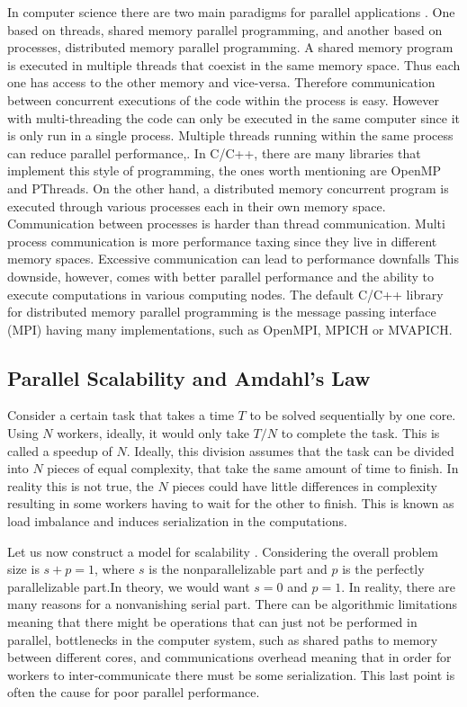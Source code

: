 	In computer science there are two main paradigms for parallel applications \cite{Hager2011}. One based on threads, shared memory parallel programming, and another based on processes, distributed memory parallel programming. 
	A shared memory program is executed in multiple threads that coexist in the same memory space. Thus each one has access to the other memory and vice-versa. Therefore communication between concurrent executions of the code within the process is easy. However with multi-threading the code can only be executed in the same computer since it is only run in a single process. Multiple threads running within the same process can reduce parallel performance,. In C/C++, there are many libraries that implement this style of programming, the ones worth mentioning are OpenMP and PThreads. 
	On the other hand, a distributed memory concurrent program is executed through various processes each in their own memory space. Communication between processes is harder than thread communication. Multi process communication is more performance taxing since they live in different memory spaces. Excessive communication can lead to performance downfalls This downside, however, comes with better parallel performance and the ability to execute computations in various computing nodes. The default C/C++ library for distributed memory parallel programming is the message passing interface (MPI) having many implementations, such as OpenMPI, MPICH or MVAPICH.


\subsection{Parallel Scalability and Amdahl's Law}

	Consider a certain task that takes a time $T$ to be solved sequentially by one core. Using $N$ workers, ideally, it would only take $T / N$ to complete the task. This is called a speedup of $N$. Ideally, this division assumes that the task can be divided into $N$ pieces of equal complexity, that take the same amount of time to finish. In reality this is not true, the $N$ pieces could have little differences in complexity resulting in some workers having to wait for the other to finish. This is known as load imbalance and induces serialization in the computations.
	
	Let us now construct a model for scalability \cite{Hager2011}. Considering the overall problem size is $s + p = 1$, where $s$ is the nonparallelizable part and $p$ is the perfectly parallelizable part.In theory, we would want $s=0$ and $p=1$. In reality, there are many reasons for a nonvanishing serial part. There can be algorithmic limitations meaning that there might be operations that can just not be performed in parallel, bottlenecks in the computer system, such as shared paths to memory between different cores, and communications overhead meaning that in order for workers to inter-communicate there must be some serialization. This last point is often the cause for poor parallel performance. 
		
